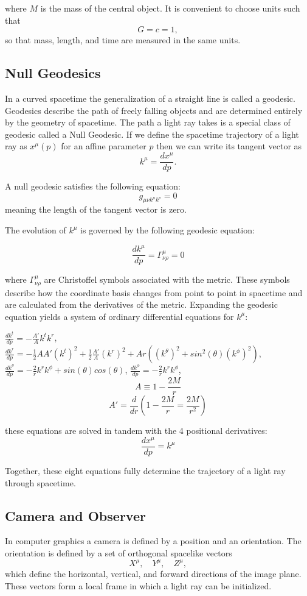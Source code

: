 \documentclass[11pt,a4paper,fleqn]{article}
\begin{document}
where $M$ is the mass of the central object. It is convenient to choose units such that \[G = c = 1,\] so that mass, length, and time are measured in the same units.


\subsection{Null Geodesics}
In a curved spacetime the generalization of a straight line is called a geodesic. Geodesics describe the path of freely falling objects and are determined entirely by the geometry of spacetime. The path a light ray takes is a special class of geodesic called a Null Geodesic. If we define the spacetime trajectory of a light ray as $x^\mu(p)$ for an affine parameter $p$ then we can write its tangent vector as \[
k^\mu = \frac{dx^\mu}{dp}.
\]

A null geodesic satisfies the following equation:
$$g_{\mu\nu k^\mu k^\nu} = 0$$
meaning the length of the tangent vector is zero.

The evolution of $k^\mu$ is governed by the following geodesic equation:

$$\frac{dk^\mu}{dp} = \Gamma^\mu_{\nu\rho} = 0$$ 

where $\Gamma^\mu_{\nu\rho}$ are Christoffel symbols associated with the metric. These symbols describe how the coordinate basis changes from point to point in spacetime and are calculated from the derivatives of the metric. Expanding the geodesic equation yields a system of ordinary differential equations for $k^\mu$:

$\frac{dk^t}{dp} =  -\frac{A'}{A} k^t k^r $,\hspace{10pt}
$\frac{dk^r}{dp} = -\frac{1}{2} AA' (k^t)^2 + \frac{1}{2} \frac{A'}{A}(k^r)^2 + Ar ((k^\theta)^2 + sin^2(\theta)(k^\phi)^2) $,
$\frac{dk^\theta}{dp} = -\frac{2}{r} k^r k^\phi + sin(\theta)cos(\theta)$,
$\frac{dk^\phi}{dp} = -\frac{2}{r}  k^r k^\phi $,
$$A \equiv 1 - \frac{2M}{r}$$
$$A' = \frac{d}{dr} (1 - \frac{2M}{r} = \frac{2M}{r^2})$$

these equations are solved in tandem with the 4 positional derivatives:
$$\frac{dx^\mu}{dp} = k^\mu$$

Together, these eight equations fully determine the trajectory of a light ray through spacetime.

\subsection{Camera and Observer}
In computer graphics a camera is defined by a position and an orientation. The orientation is defined by a set of orthogonal spacelike vectors \[X^\mu, \quad Y^\mu, \quad Z^\mu,\] which define the horizontal, vertical, and forward directions of the image plane. These vectors form a local frame in which a light ray can be initialized.
\end{document}

